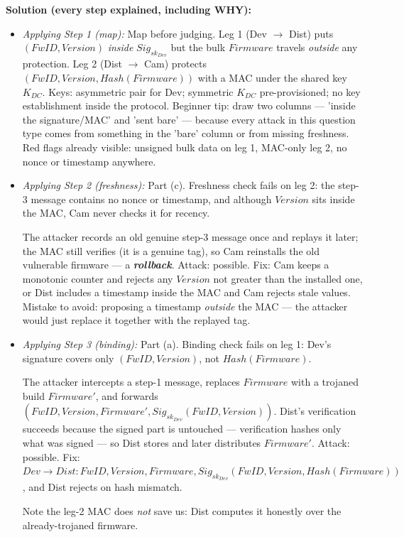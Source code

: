 \documentclass[12pt, a4paper]{article}
\newcommand{\term}[1]{\textbf{\textit{#1}}}        %
\begin{document}
\textbf{Solution (every step explained, including WHY):}
\begin{itemize}
    \item \textit{Applying Step 1 (map):} Map before judging. Leg 1 (Dev $\to$ Dist) puts $(FwID, Version)$ \emph{inside} $Sig_{sk_{Dev}}$ but the bulk $Firmware$ travels \emph{outside} any protection.
    Leg 2 (Dist $\to$ Cam) protects $(FwID, Version, Hash(Firmware))$ with a MAC under the shared key $K_{DC}$. Keys: asymmetric pair for Dev; symmetric $K_{DC}$ pre-provisioned; no key establishment inside the protocol.
    Beginner tip: draw two columns --- 'inside the signature/MAC' and 'sent bare' --- because every attack in this question type comes from something in the 'bare' column or from missing freshness. Red flags already visible: unsigned bulk data on leg 1, MAC-only leg 2, no nonce or timestamp anywhere.
    \item \textit{Applying Step 2 (freshness):} Part (c). Freshness check fails on leg 2: the step-3 message contains no nonce or timestamp, and although $Version$ sits inside the MAC, Cam never checks it for recency.

    The attacker records an old genuine step-3 message once and replays it later; the MAC still verifies (it is a genuine tag), so Cam reinstalls the old vulnerable firmware --- a \term{rollback}.
    Attack: possible. Fix: Cam keeps a monotonic counter and rejects any $Version$ not greater than the installed one, or Dist includes a timestamp inside the MAC and Cam rejects stale values.
    Mistake to avoid: proposing a timestamp \emph{outside} the MAC --- the attacker would just replace it together with the replayed tag.
    \item \textit{Applying Step 3 (binding):} Part (a). Binding check fails on leg 1: Dev's signature covers only $(FwID, Version)$, not $Hash(Firmware)$.

    The attacker intercepts a step-1 message, replaces $Firmware$ with a trojaned build $Firmware'$, and forwards $(FwID, Version, Firmware', Sig_{sk_{Dev}}(FwID, Version))$.
    Dist's verification succeeds because the signed part is untouched --- verification hashes only what was signed --- so Dist stores and later distributes $Firmware'$.
    Attack: possible. Fix: $Dev \to Dist : FwID, Version, Firmware, Sig_{sk_{Dev}}(FwID, Version, Hash(Firmware))$, and Dist rejects on hash mismatch.

    Note the leg-2 MAC does \emph{not} save us: Dist computes it honestly over the already-trojaned firmware.


\end{itemize}
\end{document}
